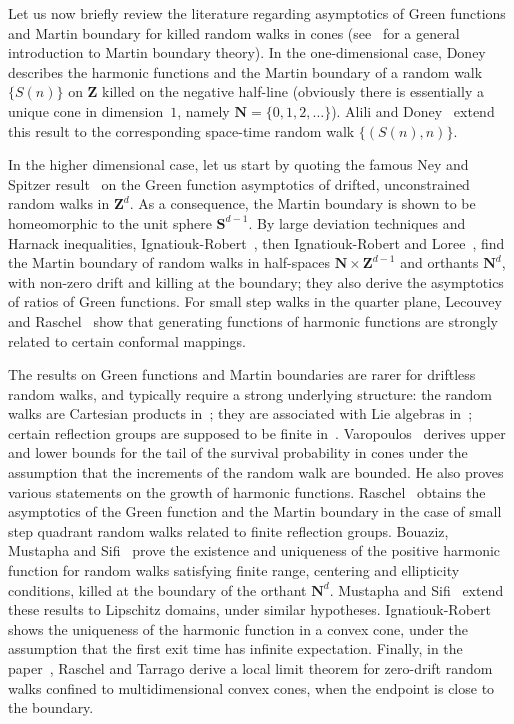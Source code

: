 \documentclass[AHL,Unicode,longabstracts,published]{cedram}
\newcommand{\bfS}{\mathbf{S}}
\newcommand{\bfZ}{\mathbf{Z}}
\newcommand{\bfN}{\mathbf{N}}
\begin{document}
Let us now briefly review the literature regarding asymptotics of Green functions and Martin boundary for killed random walks in cones (see~\cite{Sa-97} for a general introduction to Martin boundary theory). In the one-dimensional case, Doney~\cite{Do-98} describes the harmonic functions and the Martin boundary of a random walk $\{S(n)\}$ on $\bfZ$ killed on the negative half-line (obviously there is essentially a unique cone in dimension~$1$, namely $\bfN=\{0,1,2,\ldots \}$). Alili and Doney~\cite{AlDo-01} extend this result to the corresponding space-time random walk $\{(S(n),n)\}$.

In the higher dimensional case, let us start by quoting the famous Ney and Spitzer result~\cite{NeSp-66} on the Green function asymptotics of drifted, unconstrained random walks in $\bfZ^d$. As a consequence, the Martin boundary is shown to be homeomorphic to the unit sphere $\bfS^{d-1}$. By large deviation techniques and Harnack inequalities, Ignatiouk-Robert~\cite{IR-08,IR-09}, then Ignatiouk-Robert and Loree~\cite{IRLo-10}, find the Martin boundary of random walks in half-spaces $\bfN\times \bfZ^{d-1}$ and orthants $\bfN^d$, with non-zero drift and killing at the boundary; they also derive the asymptotics of ratios of Green functions. For small step walks in the quarter plane, Lecouvey and Raschel~\cite{LeRa-16} show that generating functions of harmonic functions are strongly related to certain conformal mappings.

The results on Green functions and Martin boundaries are rarer for driftless random walks, and typically require a strong underlying structure: the random walks are Cartesian products in~\cite{PiWo-92}; they are associated with Lie algebras in~\cite{Bi-91,Bi-92}; certain reflection groups are supposed to be finite in~\cite{BiBoOC-05}. Varopoulos~\cite{Va-99,Va-09} derives upper and lower bounds for the tail of the survival probability in cones under the assumption that the increments of the random walk are bounded. He also proves various statements on the growth of harmonic functions. Raschel~\cite{Ra-11,Ra-14} obtains the asymptotics of the Green function and the Martin boundary in the case of small step quadrant random walks related to finite reflection groups. Bouaziz, Mustapha and Sifi~\cite{BoMuSi-15} prove the existence and uniqueness of the positive harmonic function for random walks satisfying finite range, centering and ellipticity conditions, killed at the boundary of the orthant $\bfN^d$. Mustapha and Sifi~\cite{MuSi-19} extend these results to Lipschitz domains, under similar hypotheses. Ignatiouk-Robert~\cite{IR-21} shows the uniqueness of the harmonic function in a convex cone, under the assumption that the first exit time has infinite expectation. Finally, in the paper~\cite{RaTa-20}, Raschel and Tarrago derive a local limit theorem for zero-drift random walks confined to multidimensional convex cones, when the endpoint is close to the boundary.
\end{document}
